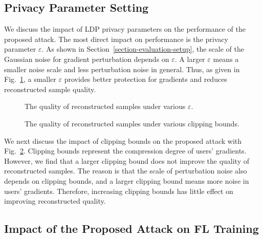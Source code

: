 \documentclass[lettersize,journal]{IEEEtran}
\begin{document}
\subsection{Privacy Parameter Setting}
\label{section-evaluation-privacy-setting}

We discuss the impact of LDP privacy parameters on the performance of the proposed attack. The most direct impact on performance is the privacy parameter $\varepsilon$. As shown in Section~\ref{section-evaluation-setup}, the scale of the Gaussian noise for gradient perturbation depends on $\varepsilon$. A larger $\varepsilon$ means a smaller noise scale and less perturbation noise in general. Thus, as given in Fig.~\ref{fig-evaluation-performance-epsilon}, a smaller $\varepsilon$ provides better protection for gradients and reduces reconstructed sample quality.

\begin{figure}
\centering
{}\hspace{-0.1in}
\caption{The quality of reconstructed samples under various $\varepsilon$.}
\label{fig-evaluation-performance-epsilon}
\end{figure}

\begin{figure}
\centering
{}\hspace{-0.1in}
\caption{The quality of reconstructed samples under various clipping bounds.}
\label{fig-evaluation-performance-clipping-bound}
\end{figure}

We next discuss the impact of clipping bounds on the proposed attack with Fig.~\ref{fig-evaluation-performance-clipping-bound}. Clipping bounds represent the compression degree of users' gradients. However, we find that a larger clipping bound does not improve the quality of reconstructed samples. The reason is that the scale of perturbation noise also depends on clipping bounds, and a larger clipping bound means more noise in users' gradients. Therefore, increasing clipping bounds has little effect on improving reconstructed quality.

\subsection{Impact of the Proposed Attack on FL Training}
\label{section-simulation-model-accuracy}
\end{document}
